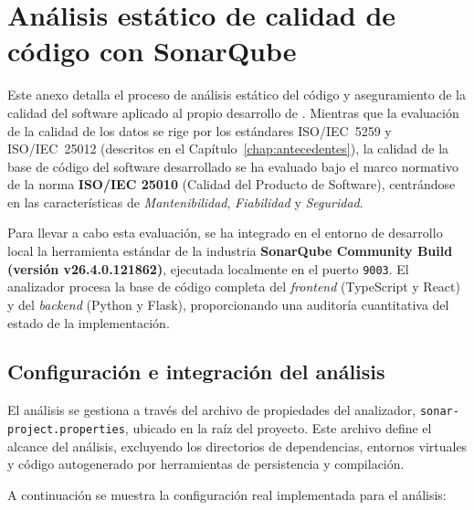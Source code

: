 \chapter{Análisis estático de calidad de código con SonarQube}
\label{anx:sonarqube}

Este anexo detalla el proceso de análisis estático del código y aseguramiento de la calidad del software aplicado al propio desarrollo de \dataqual. Mientras que la evaluación de la calidad de los datos se rige por los estándares \ac{ISO}/\ac{IEC}~5259 y \ac{ISO}/\ac{IEC}~25012 (descritos en el Capítulo~\ref{chap:antecedentes}), la calidad de la base de código del software desarrollado se ha evaluado bajo el marco normativo de la norma \textbf{ISO/IEC 25010} (Calidad del Producto de Software), centrándose en las características de \emph{Mantenibilidad}, \emph{Fiabilidad} y \emph{Seguridad}.

Para llevar a cabo esta evaluación, se ha integrado en el entorno de desarrollo local la herramienta estándar de la industria \textbf{SonarQube Community Build (versión v26.4.0.121862)}, ejecutada localmente en el puerto \texttt{9003}. El analizador procesa la base de código completa del \emph{frontend} (TypeScript y React) y del \emph{backend} (Python y Flask), proporcionando una auditoría cuantitativa del estado de la implementación.

\section{Configuración e integración del análisis}
\label{sec:sonar-config}

El análisis se gestiona a través del archivo de propiedades del analizador,
\texttt{sonar-project.properties}, ubicado en la raíz del proyecto.
Este archivo define el alcance del análisis, excluyendo los directorios de
dependencias, entornos virtuales y código autogenerado por herramientas de
persistencia y compilación.

A continuación se muestra la configuración real implementada para el análisis:

